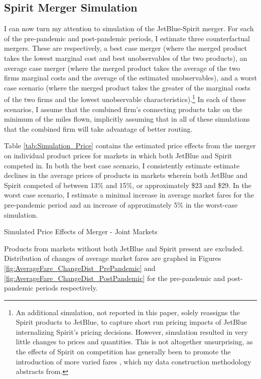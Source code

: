 \documentclass{article}
\begin{document}
	\subsection{Spirit Merger Simulation}
	\label{sec:Analysis_Merger}
	I can now turn my attention to simulation of the JetBlue-Spirit merger. For each of the pre-pandemic and post-pandemic periods, I estimate three counterfactual mergers. These are respectively, a best case merger (where the merged product takes the lowest marginal cost and best unobservables of the two products), an average case merger (where the merged product takes the average of the two firms marginal costs and the average of the estimated unobservables), and a worst case scenario (where the merged product takes the greater of the marginal costs of the two firms and the lowest unobservable characteristics).\footnote{An additional simulation, not reported in this paper, solely reassigns the Spirit products to JetBlue, to capture short run pricing impacts of JetBlue internalizing Spirit's pricing decisions. However, simulation resulted in very little changes to prices and quantities. This is not altogether unsurprising, as the effects of Spirit on competition has generally been to promote the introduction of more varied fares \citep{shrago_spirit_2024}, which my data construction methodology abstracts from.} In each of these scenarios, I assume that the combined firm's connecting products take on the minimum of the miles flown, implicitly assuming that in all of these simulations that the combined firm will take advantage of better routing. %

     
	 Table \ref{tab:Simulation_Price} contains the estimated price effects from the merger on individual product prices for markets in which both JetBlue and Spirit competed in. In both the best case scenario, I consistently estimate estimate declines in the average prices of products in markets wherein both JetBlue and Spirit competed of between 13\% and 15\%, or approximately \$23 and \$29. In the worst case scenario, I estimate a minimal increase in average market fares for the pre-pandemic period and an increase of approximately 5\% in the worst-case simulation. 
     
    \begin{table}
        \caption{Simulated Price Effects of Merger - Joint Markets}
        \label{tab:Simulation_Price}
                \vspace{-15mm}
        \begin{center}
         
         \footnotesize{Products from markets without both JetBlue and Spirit present are excluded. Distribution of changes of average market fares are graphed in Figures \ref{fig:AverageFare_ChangeDist_PrePandemic} and \ref{fig:AverageFare_ChangeDist_PostPandemic} for the pre-pandemic and post-pandemic periods respectively.}
        \end{center}
     \end{table}
\end{document}

